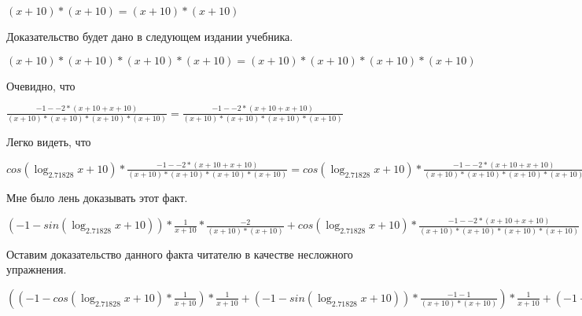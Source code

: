 \documentclass[12pt,a4paper,fleqn]{article}
\theoremstyle{definition}
\begin{document}
$( x  +  10 ) * ( x  +  10 ) = ( x  +  10 ) * ( x  +  10 )$

Доказательство будет дано в следующем издании учебника. 

$( x  +  10 ) * ( x  +  10 ) * ( x  +  10 ) * ( x  +  10 ) = ( x  +  10 ) * ( x  +  10 ) * ( x  +  10 ) * ( x  +  10 )$

Очевидно, что 

$\frac{ -1  -  -2  * ( x  +  10  +  x  +  10 )}{( x  +  10 ) * ( x  +  10 ) * ( x  +  10 ) * ( x  +  10 )}
 = \frac{ -1  -  -2  * ( x  +  10  +  x  +  10 )}{( x  +  10 ) * ( x  +  10 ) * ( x  +  10 ) * ( x  +  10 )}
$

Легко видеть, что 

$cos(\log_{ 2.71828 }{ x  +  10 }) * \frac{ -1  -  -2  * ( x  +  10  +  x  +  10 )}{( x  +  10 ) * ( x  +  10 ) * ( x  +  10 ) * ( x  +  10 )}
 = cos(\log_{ 2.71828 }{ x  +  10 }) * \frac{ -1  -  -2  * ( x  +  10  +  x  +  10 )}{( x  +  10 ) * ( x  +  10 ) * ( x  +  10 ) * ( x  +  10 )}
$

Мне было лень доказывать этот факт.

$( -1  - sin(\log_{ 2.71828 }{ x  +  10 })) * \frac{ 1 }{ x  +  10 }
 * \frac{ -2 }{( x  +  10 ) * ( x  +  10 )}
 + cos(\log_{ 2.71828 }{ x  +  10 }) * \frac{ -1  -  -2  * ( x  +  10  +  x  +  10 )}{( x  +  10 ) * ( x  +  10 ) * ( x  +  10 ) * ( x  +  10 )}
 = ( -1  - sin(\log_{ 2.71828 }{ x  +  10 })) * \frac{ 1 }{ x  +  10 }
 * \frac{ -2 }{( x  +  10 ) * ( x  +  10 )}
 + cos(\log_{ 2.71828 }{ x  +  10 }) * \frac{ -1  -  -2  * ( x  +  10  +  x  +  10 )}{( x  +  10 ) * ( x  +  10 ) * ( x  +  10 ) * ( x  +  10 )}
$

Оставим доказательство данного факта читателю в качестве несложного упражнения. 

$(( -1  - cos(\log_{ 2.71828 }{ x  +  10 }) * \frac{ 1 }{ x  +  10 }
) * \frac{ 1 }{ x  +  10 }
 + ( -1  - sin(\log_{ 2.71828 }{ x  +  10 })) * \frac{ -1  -  1 }{( x  +  10 ) * ( x  +  10 )}
) * \frac{ 1 }{ x  +  10 }
 + ( -1  - sin(\log_{ 2.71828 }{ x  +  10 })) * \frac{ 1 }{ x  +  10 }
 * \frac{ -1  -  1 }{( x  +  10 ) * ( x  +  10 )}
 + ( -1  - sin(\log_{ 2.71828 }{ x  +  10 })) * \frac{ 1 }{ x  +  10 }
 * \frac{ -2 }{( x  +  10 ) * ( x  +  10 )}
 + cos(\log_{ 2.71828 }{ x  +  10 }) * \frac{ -1  -  -2  * ( x  +  10  +  x  +  10 )}{( x  +  10 ) * ( x  +  10 ) * ( x  +  10 ) * ( x  +  10 )}
 = (( -1  - cos(\log_{ 2.71828 }{ x  +  10 }) * \frac{ 1 }{ x  +  10 }
) * \frac{ 1 }{ x  +  10 }
 + ( -1  - sin(\log_{ 2.71828 }{ x  +  10 })) * \frac{ -1  -  1 }{( x  +  10 ) * ( x  +  10 )}
) * \frac{ 1 }{ x  +  10 }
 + ( -1  - sin(\log_{ 2.71828 }{ x  +  10 })) * \frac{ 1 }{ x  +  10 }
 * \frac{ -1  -  1 }{( x  +  10 ) * ( x  +  10 )}
 + ( -1  - sin(\log_{ 2.71828 }{ x  +  10 })) * \frac{ 1 }{ x  +  10 }
 * \frac{ -2 }{( x  +  10 ) * ( x  +  10 )}
 + cos(\log_{ 2.71828 }{ x  +  10 }) * \frac{ -1  -  -2  * ( x  +  10  +  x  +  10 )}{( x  +  10 ) * ( x  +  10 ) * ( x  +  10 ) * ( x  +  10 )}
$
\end{document}
